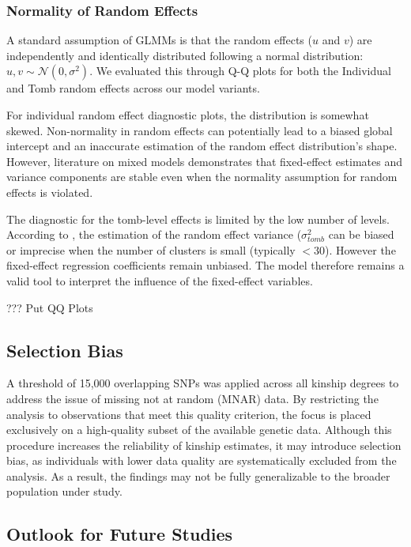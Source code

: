 \documentclass[
]{ajs}
\begin{document}
\subsubsection{Normality of Random
Effects}\label{normality-of-random-effects}

A standard assumption of GLMMs is that the random effects (\(u\) and
\(v\)) are independently and identically distributed following a normal
distribution: \(u,v \sim \mathcal{N}(0, \sigma^2)\). We evaluated this
through Q-Q plots for both the Individual and Tomb random effects across
our model variants.

For individual random effect diagnostic plots, the distribution is
somewhat skewed. Non-normality in random effects can potentially lead to
a biased global intercept and an inaccurate estimation of the random
effect distribution's shape. However, literature on mixed models
\citet{mcculloch2011misspecifying} demonstrates that fixed-effect
estimates and variance components are stable even when the normality
assumption for random effects is violated.

The diagnostic for the tomb-level effects is limited by the low number
of levels. According to \citet{maas2005sufficient}, the estimation of
the random effect variance (\(\sigma^2_{tomb}\) can be biased or
imprecise when the number of clusters is small (typically \(<30\)).
However the fixed-effect regression coefficients remain unbiased. The
model therefore remains a valid tool to interpret the influence of the
fixed-effect variables.

??? Put QQ Plots

\subsection{Selection Bias}\label{selection-bias}

A threshold of 15,000 overlapping SNPs was applied across all kinship
degrees to address the issue of missing not at random (MNAR) data. By
restricting the analysis to observations that meet this quality
criterion, the focus is placed exclusively on a high-quality subset of
the available genetic data. Although this procedure increases the
reliability of kinship estimates, it may introduce selection bias, as
individuals with lower data quality are systematically excluded from the
analysis. As a result, the findings may not be fully generalizable to
the broader population under study.

\subsection{Outlook for Future
Studies}\label{outlook-for-future-studies}
\end{document}
